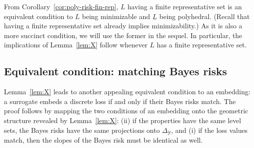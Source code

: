 \documentclass[twoside,11pt]{article}
\newcommand{\simplex}{\Delta_\Y}
\newcommand{\Y}{\mathcal{Y}}
\newcommand{\risk}[1]{\underline{#1}}
\begin{document}
From Corollary~\ref{cor:poly-risk-fin-rep}, $L$ having a finite representative set is an equivalent condition to $L$ being minimizable and $\risk{L}$ being polyhedral.
(Recall that having a finite representative set already implies minimizability.)
As it is also a more succinct condition, we will use the former in the sequel.
In particular, the implications of Lemma~\ref{lem:X} follow whenever $L$ has a finite representative set.


\subsection{Equivalent condition: matching Bayes risks}\label{subsec:match-BR}


Lemma~\ref{lem:X} leads to another appealing equivalent condition to an embedding: a surrogate embeds a discrete loss if and only if their Bayes risks match.
The proof follows by mapping the two conditions of an embedding onto the geometric structure revealed by Lemma~\ref{lem:X}: (ii) if the properties have the same level sets, the Bayes risks have the same projections onto $\simplex$, and (i) if the loss values match, then the slopes of the Bayes risk must be identical as well.
\end{document}

